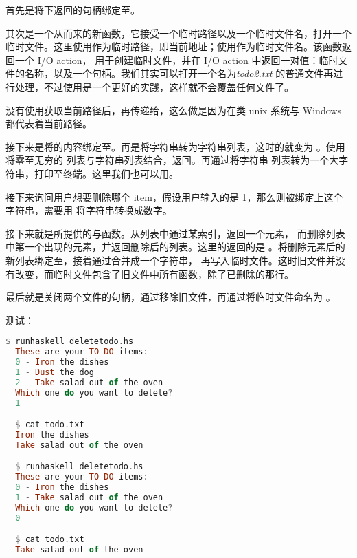 \documentclass[./main.tex]{subfiles}
\begin{document}
首先是将下返回的句柄绑定至。

其次是一个从而来的新函数，它接受一个临时路径以及一个临时文件名，打开一个
临时文件。这里使用作为临时路径，即当前地址；使用作为临时文件名。该函数返回一个 I/O action，
用于创建临时文件，并在 I/O action 中返回一对值：临时文件的名称，以及一个句柄。我们其实可以打开一个名为\textit{todo2.txt}
的普通文件再进行处理，不过使用是一个更好的实践，这样就不会覆盖任何文件了。

没有使用获取当前路径后，再传递给，这么做是因为在类 unix
系统与 Windows 都代表着当前路径。

接下来是将的内容绑定至。再是将字符串转为字符串列表，这时的就变为
。使用将零至无穷的
列表与字符串列表结合，返回\acode{["0 - Iron the dishes", "1 - Dust the dog" ...}。再通过将字符串
列表转为一个大字符串，打印至终端。这里我们也可以用。

接下来询问用户想要删除哪个 item，假设用户输入的是 1，那么则被绑定上这个字符串，需要用
将字符串转换成数字。

接下来就是所提供的与\acode{!!}函数。\acode{!!}从列表中通过某索引，返回一个元素，
而删除列表中第一个出现的元素，并返回删除后的列表。这里的返回的是
。将删除元素后的新列表绑定至，接着通过合并成一个字符串，
再写入临时文件。这时旧文件并没有改变，而临时文件包含了旧文件中所有函数，除了已删除的那行。

最后就是关闭两个文件的句柄，通过移除旧文件，再通过将临时文件命名为
。

测试：

\begin{lstlisting}[language=Haskell]
  $ runhaskell deletetodo.hs
  These are your TO-DO items:
  0 - Iron the dishes
  1 - Dust the dog
  2 - Take salad out of the oven
  Which one do you want to delete?
  1

  $ cat todo.txt
  Iron the dishes
  Take salad out of the oven

  $ runhaskell deletetodo.hs
  These are your TO-DO items:
  0 - Iron the dishes
  1 - Take salad out of the oven
  Which one do you want to delete?
  0

  $ cat todo.txt
  Take salad out of the oven
\end{lstlisting}
\end{document}
